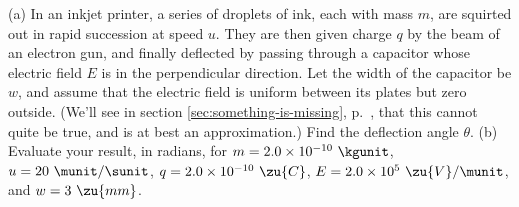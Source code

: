 (a) In an inkjet printer, a series of droplets of ink, each with mass $m$, are squirted out in rapid succession
at speed $u$. They are then given charge $q$ by the beam of an electron gun, and
finally deflected by passing through a capacitor whose electric field $E$
is in the perpendicular direction. Let the width of the capacitor be $w$, and assume that
the electric field is uniform between its plates but zero outside. (We'll see in
section \ref{sec:something-is-missing}, p.~\pageref{sec:something-is-missing}, that this
cannot quite be true, and is at best an approximation.) Find the deflection angle $\theta$.\answercheck\hwendpart
(b) Evaluate your result, in radians, for $m=2.0\times10^{-10}\ \kgunit$, $u=20\ \munit/\sunit$, $q=2.0\times10^{-10}\ \zu{C}$, 
$E=2.0\times10^5\ \zu{V}/\munit$, and $w=3\ \zu{mm}$.\answercheck\hwendpart

